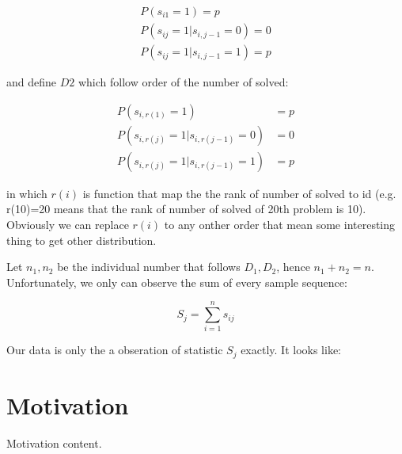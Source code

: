 \documentclass{article}
\begin{document}
\begin{align*} %
P(s_{i1} = 1) = p \\
P(s_{ij} = 1 | s_{i,j-1}=0) = 0 \\
P(s_{ij} = 1 | s_{i,j-1}=1) = p
\end{align*}


and define $D2$ which follow order of the number of solved:


\begin{align*}
P(s_{i,r(1)} = 1) &= p \\
P(s_{i,r(j)} = 1 | s_{i,r(j-1)}=0) &= 0 \\
P(s_{i,r(j)} = 1 | s_{i,r(j-1)}=1) &= p
\end{align*}


in which $r(i)$ is function that map the the rank of number of solved to id
(e.g. r(10)=20 means that the rank of number of solved of 20th problem is 10).
Obviously we can replace $r(i)$ to any onther order that mean some interesting thing to get other distribution.

Let $n_1,n_2$ be the individual number that follows $D_1,D_2$, hence $n_1+n_2=n$. Unfortunately, we only can 
observe the sum of every sample sequence:

$$
S_j = \sum_{i=1}^n s_{ij}
$$ 

Our data is only the a obseration of statistic $S_j$ exactly. It looks like:



\section{Motivation}

Motivation content.
\end{document}
